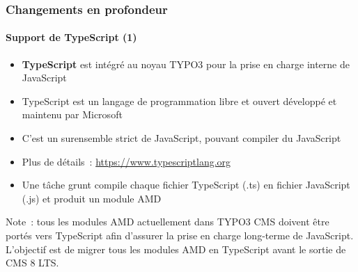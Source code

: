 \begin{frame}[fragile]
	\frametitle{Changements en profondeur}
	\framesubtitle{Support de TypeScript (1)}

	\begin{itemize}
		\item \textbf{TypeScript} est intégré au noyau TYPO3 pour la prise en charge interne de JavaScript
		\item TypeScript est un langage de programmation libre et ouvert développé et maintenu par Microsoft
		\item C'est un surensemble strict de JavaScript, pouvant compiler du JavaScript
		\item Plus de détails~: \url{https://www.typescriptlang.org}
		\item Une tâche grunt compile chaque fichier TypeScript (.ts) en fichier JavaScript (.js) et produit un module AMD
	\end{itemize}

	\small
		Note~: tous les modules AMD actuellement dans TYPO3 CMS doivent être portés vers TypeScript
		afin d'assurer la prise en charge long-terme de JavaScript.
		L'objectif est de migrer tous les modules AMD en TypeScript avant le sortie de CMS 8 LTS.
	\normalsize

\end{frame}


